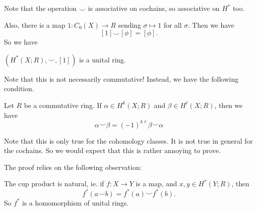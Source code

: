 \documentclass[a4paper]{article}
\begin{document}
Note that the operation $\smile$ is associative on cochains, so associative on $H^*$ too.

Also, there is a map $1: C_0(X) \to R$ sending $\sigma \mapsto 1$ for all $\sigma$. Then we have
\[
  [1] \smile [\phi] = [\phi].
\]
So we have
\begin{prop}
  $(H^*(X; R), \smile, [1])$ is a unital ring.
\end{prop}

Note that this is not necessarily commutative! Instead, we have the following  condition.
\begin{prop}
  Let $R$ be a commutative ring. If $\alpha \in H^k(X; R)$ and $\beta \in H^\ell(X; R)$, then we have
  \[
    \alpha \smile \beta = (-1)^{k\ell}\beta \smile \alpha
  \]
\end{prop}

Note that this is only true for the cohomology classes. It is not true in general for the cochains. So we would expect that this is rather annoying to prove.

The proof relies on the following observation:

\begin{prop}
  The cup product is natural, ie. if $f: X \to Y$ is a map, and $x, y \in H^*(Y; R)$, then
  \[
    f^*(a \smile b) = f^*(a) \smile f^*(b).
  \]
  So $f^*$ is a homomorphism of unital rings.
\end{prop}
\end{document}

